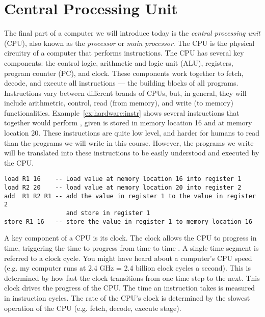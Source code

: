 \section {Central Processing Unit}

The final part of a computer we will introduce today is the \emph{central processing
unit} (CPU), also known as the \emph{processor} or \emph{main processor}. The CPU is the physical
circuitry of a computer that performs instructions. The CPU has several key
components: the control logic, arithmetic and logic unit (ALU), registers,
program counter (PC), and clock. These components work together to 
fetch, decode, and execute all instructions --- the building blocks of all programs.
Instructions vary between different brands of CPUs, but, in general, they will
include arithmetric, control, read (from memory), and write (to memory) functionalities.
Example~\ref{ex:hardware:instr} shows several instructions
that together would perform , given  is stored in memory
location 16 and  at memory location 20. These instructions are quite low
level, and harder for humans to read than the programs we will write in this course.
However, the programs we write will be translated into these instructions to be
easily understood and executed by the CPU.

\begin{example}
\label{ex:hardware:instr}
\begin{verbatim}
load R1 16    -- Load value at memory location 16 into register 1
load R2 20    -- load value at memory location 20 into register 2
add  R1 R2 R1 -- add the value in register 1 to the value in register 2
                 and store in register 1
store R1 16   -- store the value in register 1 to memory location 16
\end{verbatim}
\end{example}

A key component of a CPU is its clock. The clock allows the CPU to progress in time,
triggering the time to progress from time  to time . A single time
segment is referred to a clock cycle. You might have heard about a computer's CPU
speed (e.g. my computer runs at 2.4 GHz = 2.4 billion clock cycles a second). This
is determined by how fast the clock transitions from one time step to the next. This
clock drives the progress of the CPU. The time an instruction takes is measured
in instruction cycles. The rate of the CPU's clock is determined by the slowest
operation of the CPU (e.g. fetch, decode, execute stage).

